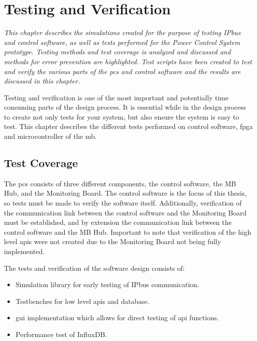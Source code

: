 \documentclass[main.tex]{subfiles}
\begin{document}
\section{Testing and Verification}

\textit{This chapter describes the simulations created for the purpose of testing IPbus and control software, as well as tests performed for the Power Control System prototype. Testing methods and test coverage is analyzed and discussed and methods for error prevention are highlighted. Test scripts have been created to test and verify the various parts of the \gls{pcs} and control software and the results are discussed in this chapter.}

Testing and verification is one of the most important and potentially time consuming parts of the design process. It is essential while in the design process to create not only tests for your system, but also ensure the system is easy to test. This chapter describes the different tests performed on control software, \gls{fpga} and microcontroller of the \gls{mb}.

\subsection{Test Coverage}

The \gls{pcs} consists of three different components, the control software, the MB Hub, and the Monitoring Board. The control software is the focus of this thesis, so tests must be made to verify the software itself. Additionally, verification of the communication link between the control software and the Monitoring Board must be established, and by extension the communication link between the control software and the MB Hub. Important to note that verification of the high level \gls{api}s were not created due to the Monitoring Board not being fully implemented.

The tests and verification of the software design consists of:

\begin{itemize}
    \item Simulation library for early testing of IPbus communication.
    \item Testbenches for low level \gls{api}s and database.
    \item \gls{gui} implementation which allows for direct testing of \gls{api} functions.
    \item Performance test of InfluxDB.
\end{itemize}
\end{document}
